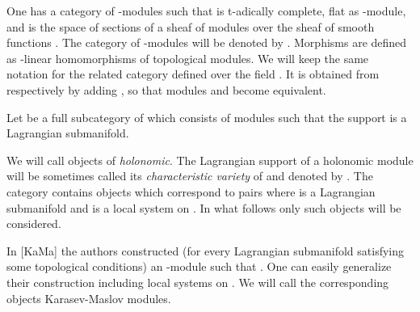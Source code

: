 \documentclass[a4paper,12pt]{article}
\begin{document}
One has a category of \coordHE{}-modules \coordHE{} 
 such that \coordHE{} is t-adically complete,
flat as \myHighlight{$\C[[t]]$}\coordHE{}-module, and \coordHE{} is
the space of sections of a sheaf of modules over the sheaf 
of smooth functions \coordHE{}. 
The category of \coordHE{}-modules  will be denoted by
\coordHE{}.
 Morphisms are defined
as \myHighlight{$\C[[t]]$}\coordHE{}-linear homomorphisms of topological modules.
We will keep the same notation for  the related category 
 defined
over the field \coordHE{}. It is obtained from
\coordHE{} respectively \coordHE{} by adding \coordHE{}, so that modules \coordHE{} and \coordHE{} become
equivalent. 



Let \coordHE{} be a full subcategory of \coordHE{}
which consists of modules \coordHE{} such that the support \coordHE{} is
a Lagrangian submanifold.

We will call objects of \coordHE{} 
{\it holonomic}.
The Lagrangian support \coordHE{} of a holonomic module will be sometimes called its
{\it characteristic
variety} of \coordHE{} and denoted by \coordHE{}. The 
category \coordHE{}  contains
objects  \coordHE{} which correspond to pairs
\coordHE{} where \coordHE{} is a Lagrangian submanifold and
\myHighlight{$\rho$}\coordHE{} is a local system on \coordHE{}. In what follows only such objects
will be considered. 

\begin{rmk}
 In [KaMa] the authors constructed (for every Lagrangian submanifold \coordHE{} satisfying
some topological conditions)
an \coordHE{}-module \coordHE{} such that \coordHE{}. 
One can easily generalize their construction including local systems on \coordHE{}.
We will call the corresponding objects
Karasev-Maslov modules.

\end{rmk}
\end{document}

